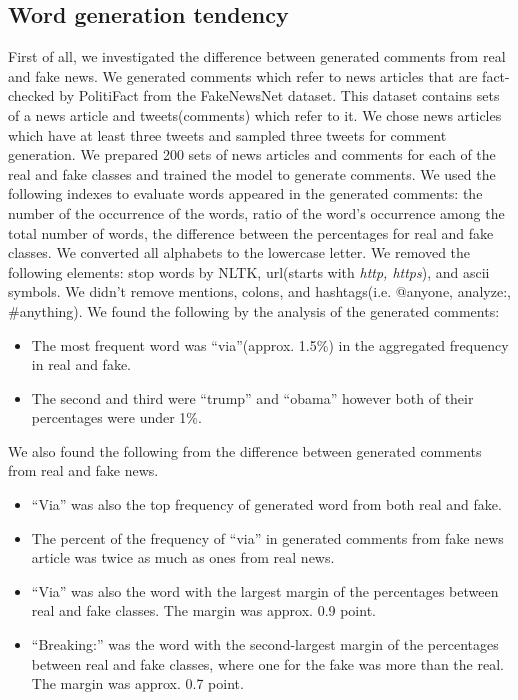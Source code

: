 \documentclass[conference]{IEEEtran}
\begin{document}
\subsection{Word generation tendency}
\label{subsec:trend}
First of all, we investigated the difference between generated comments from real and fake news.
We generated comments which refer to news articles that are fact-checked by PolitiFact from the FakeNewsNet dataset\cite{Shu2018FakeNewsNetAD}.
This dataset contains sets of a news article and tweets(comments) which refer to it.
We chose news articles which have at least three tweets and sampled three tweets for comment generation.
We prepared 200 sets of news articles and comments for each of the real and fake classes and trained the model to generate comments.
We used the following indexes to evaluate words appeared in the generated comments:
the number of the occurrence of the words,
ratio of the word's occurrence among the total number of words,
the difference between the percentages for real and fake classes.
We converted all alphabets to the lowercase letter.
We removed the following elements: stop words by NLTK\cite{bird-loper-2004-nltk}, 
url(starts with \textit{http, https}), and ascii symbols.
We didn't remove mentions, colons, and hashtags(i.e. @anyone, analyze:, \#anything).
We found the following by the analysis of the generated comments:
\begin{itemize}[]
    \item The most frequent word was ``via''(approx. 1.5\%) in the aggregated frequency in real and fake.  
    \item The second and third were ``trump'' and ``obama'' however both of their percentages were under 1\%.
\end{itemize}
We also found the following from the difference between generated comments from real and fake news.
\begin{itemize}[]
    \item ``Via'' was also the top frequency of generated word from both real and fake. 
    \item The percent of the frequency of ``via'' in generated comments from fake news article was twice as much as ones from real news.
    \item ``Via'' was also the word with the largest margin of the percentages between real and fake classes. 
    The margin was approx. 0.9 point.
    \item ``Breaking:'' was the word with the second-largest margin of the percentages between real and fake classes, 
    where one for the fake was more than the real. 
    The margin was approx. 0.7 point.
\end{itemize}
\end{document}
